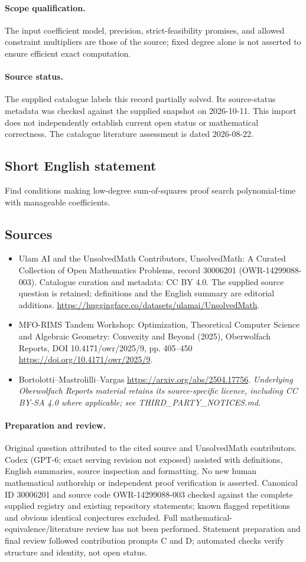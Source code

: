 \documentclass[11pt]{article}
\begin{document}
\paragraph{Scope qualification.}
The input coefficient model, precision, strict-feasibility promises, and allowed constraint multipliers are those of the source; fixed degree alone is not asserted to ensure efficient exact computation.
\paragraph{Source status.}
The supplied catalogue labels this record partially solved. Its source-status metadata was checked against the supplied snapshot on 2026-10-11. This import does not independently establish current open status or mathematical correctness. The catalogue literature assessment is dated 2026-08-22.
\subsection{Short English statement}
Find conditions making low-degree sum-of-squares proof search polynomial-time with manageable coefficients.
\subsection{Sources}
\begin{itemize}
\item[S1] Ulam AI and the UnsolvedMath Contributors, UnsolvedMath: A Curated Collection of Open Mathematics Problems, record 30006201 (OWR-14299088-003). Catalogue curation and metadata: CC BY 4.0. The supplied source question is retained; definitions and the English summary are editorial additions.
\url{https://huggingface.co/datasets/ulamai/UnsolvedMath}.
\item[S2] MFO-RIMS Tandem Workshop: Optimization, Theoretical Computer Science and Algebraic Geometry: Convexity and Beyond (2025), Oberwolfach Reports, DOI 10.4171/owr/2025/9, pp. 405--450
\url{https://doi.org/10.4171/owr/2025/9}.
\item[S3] Bortolotti--Mastrolilli--Vargas
\url{https://arxiv.org/abs/2504.17756}.
\textit{Underlying Oberwolfach Reports material retains its source-specific licence, including CC BY-SA 4.0 where applicable; see THIRD\_PARTY\_NOTICES.md.}
\end{itemize}
\paragraph{Preparation and review.}
Original question attributed to the cited source and UnsolvedMath contributors. Codex (GPT-6; exact serving revision not exposed) assisted with definitions, English summaries, source inspection and formatting. No new human mathematical authorship or independent proof verification is asserted. Canonical ID 30006201 and source code OWR-14299088-003 checked against the complete supplied registry and existing repository statements; known flagged repetitions and obvious identical conjectures excluded. Full mathematical-equivalence/literature review has not been performed. Statement preparation and final review followed contribution prompts C and D; automated checks verify structure and identity, not open status.
\label{end:30006201}
\end{document}
